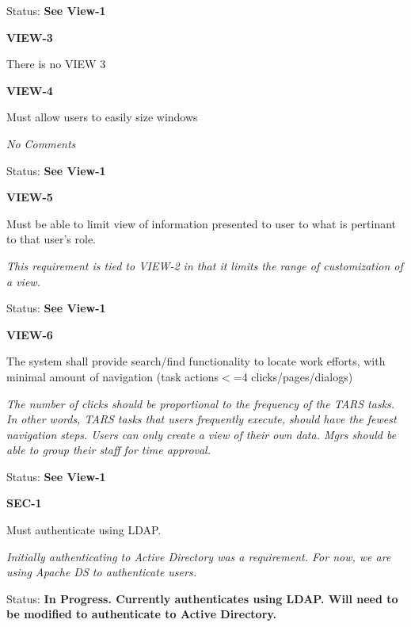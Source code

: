 Status: \textbf{See View-1}\\

\noindent 

\noindent \textbf{VIEW-3}

\noindent There is no VIEW 3

\noindent

\noindent \textbf{VIEW-4}

\noindent Must allow users to easily size windows

 \textit{No Comments}

\textit{ }Status: \textbf{See View-1}\textit{}\\

\noindent 

\noindent \textbf{VIEW-5}

\noindent Must be able to limit view of information presented to user to what is pertinant to that user's role.

\textit{This requirement is tied to VIEW-2 in that it limits the range of customization of a view.}

Status: \textbf{See View-1}\\

\noindent 

\noindent \textbf{VIEW-6}

\noindent The system shall provide search/find functionality to locate work efforts, with minimal amount of navigation (task actions$<$=4 clicks/pages/dialogs)

\noindent \textit{The number of clicks should be proportional to the frequency of the TARS tasks. In other words, TARS tasks that users frequently execute, should have the fewest navigation steps. Users can only create a view of their own data. Mgrs should be able to group their staff for time approval.}

\noindent Status: \textbf{See View-1}\\

\noindent 

\noindent \textbf{SEC-1}

\noindent Must authenticate using LDAP.

\noindent \textit{Initially authenticating to Active Directory was a requirement. For now, we are using Apache DS to authenticate users. }

\noindent Status: \textbf{In Progress.  Currently authenticates using LDAP.  Will need to be modified to authenticate to Active Directory.}\textit{}\\

